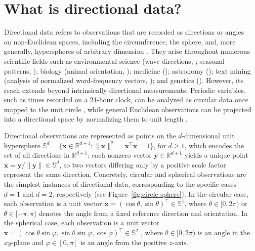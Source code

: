 \documentclass[12pt]{report} %
\newcommand{\bx}{\mathbf{x}}
\newcommand{\by}{\mathbf{y}}
\newcommand{\Sd}{\mathbb{S}^{d}}
\begin{document}
\section{What is directional data?}
Directional data refers to observations that are recorded as directions or angles on non-Euclidean spaces, including the circumference, the sphere, and, more generally, hyperspheres of arbitrary dimension \citep{Mardia1999a, Ley2017a}. They arise throughout numerous scientific fields such as environmental science (wave directions, \citet{Jona-Lasinio2012}; seasonal patterns, \citet{Oliveira2013}); biology (animal orientation, \citet{Best1981}); medicine (\citealt{Pardo2017}); astronomy (\citet{Marinucci2008, Marinucci2011}); text mining (analysis of normalized word-frequency vectors, \citet{Banerjee2005}); and genetics (\citealt{Eisen1998}). However, its reach extends beyond intrinsically directional measurements. Periodic variables, such as times recorded on a 24-hour clock, can be analyzed as circular data once mapped to the unit circle \citep{Gill2010}, while general Euclidean observations can be projected into a directional space by normalizing them to unit length \citep{Banerjee2005}.

Directional observations are represented as points on the $d$-dimensional unit hypersphere $\Sd= \{\bx \in \mathbb{R}^{d+1} :\|\bx\|^{2}=\bx^\top\bx=1\}$, for $d\geq 1$, which encodes the set of all directions in $\mathbb{R}^{d+1}$: each nonzero vector $\by\in\mathbb{R}^{d+1}$ yields a unique point $\bx= \by/\|\by\| \in \Sd$, so two vectors differing only by a positive scale factor represent the same direction.  Concretely, circular and spherical observations are the simplest instances of directional data, corresponding to the specific cases $d=1$ and $d=2$, respectively (see  Figure~\ref{fig:circle-sphere}). In the circular case, each observation is a unit vector $\bx=(\cos \theta,\sin \theta)^\top \in \mathbb{S}^1$, where $\theta \in [0,2\pi)$ or $\theta\in[-\pi,\pi)$ denotes the angle from a fixed reference direction and orientation. In the spherical case, each observation is a unit vector $\bx=(\cos \theta \sin \varphi, \sin \theta \sin \varphi, \cos \varphi)^\top \in \mathbb{S}^2$ \citep{Garcia-PortuguesPhD}, where $\theta\in[0,2\pi)$ is an angle in the $xy$-plane and $\varphi\in[0,\pi]$ is an angle from the positive $z$-axis.
\end{document}
